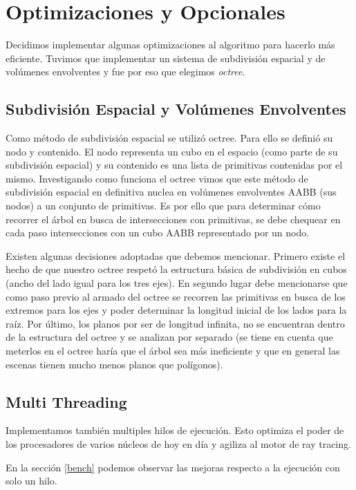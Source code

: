 \documentclass[a4paper,10pt]{article}
\begin{document}
\section{Optimizaciones y Opcionales}
Decidimos implementar algunas optimizaciones al algoritmo para hacerlo m\'as
eficiente.  Tuvimos que implementar un sistema de subdivisi\'on espacial y de
vol\'umenes envolventes y fue por eso que elegimos \emph{octree}.
\subsection{Subdivisi\'on Espacial y Vol\'umenes Envolventes}
\label{octree}

Como m\'etodo de subdivisi\'on espacial se utiliz\'o octree. Para ello se defini\'o su
nodo y contenido. El nodo representa un cubo en el espacio (como parte de su
subdivisi\'on espacial) y su contenido es una lista de primitivas contenidas por
el mismo. Investigando como funciona el octree vimos que este m\'etodo de
subdivisi\'on espacial en definitiva nuclea en vol\'umenes envolventes AABB (sus
nodos) a un conjunto de primitivas. Es por ello que para determinar c\'omo
recorrer el \'arbol en busca de intersecciones con primitivas, se debe chequear en
cada paso intersecciones con un cubo AABB representado por un nodo.

Existen algunas decisiones adoptadas que debemos mencionar. Primero existe el
hecho de que nuestro octree respet\'o la estructura b\'asica de subdivisi\'on en cubos
(ancho del lado igual para los tres ejes). En segundo lugar debe mencionarse que
como paso previo al armado del octree se recorren las primitivas en busca de los
extremos para los ejes y poder determinar la longitud inicial de los lados para
la ra\'iz. Por \'ultimo, los planos por ser de longitud infinita, no se encuentran
dentro de la estructura del octree y se analizan por separado (se tiene en
cuenta que meterlos en el octree har\'ia que el \'arbol sea m\'as ineficiente y que en
general las escenas tienen mucho menos planos que pol\'igonos).

\subsection{Multi Threading}

Implementamos tambi\'en multiples hilos de ejecuci\'on.  Esto optimiza el poder
de los procesadores de varios n\'ucleos de hoy en d\'ia y agiliza al motor de
ray tracing.

En la secci\'on \ref{bench} podemos observar las mejoras respecto a la
ejecuci\'on con solo un hilo.
\end{document}
